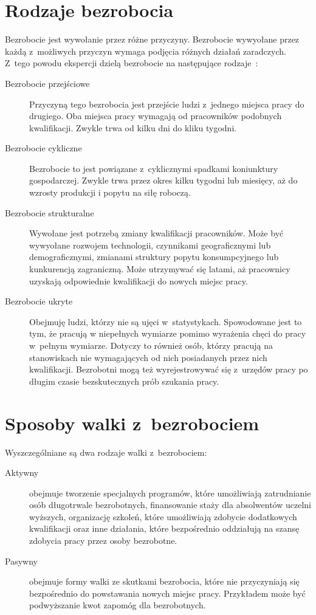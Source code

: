 \documentclass[12pt]{article}
\begin{document}
    \section*{Rodzaje bezrobocia}
    Bezrobocie jest wywołanie przez różne przyczyny. Bezrobocie wywyołane przez każdą z~możliwych przyczyn wymaga podjęcia różnych działań zaradczych. Z~tego powodu ekspercji dzielą bezrobocie na następujące rodzaje~\cite{eko}:
    \begin{description}
        \item[Bezrobocie przejściowe] Przyczyną tego bezrobocia jest przejście ludzi z~jednego miejsca pracy do drugiego. Oba miejsca pracy wymagają od pracowników podobnych kwalifikacji. Zwykle trwa od kilku dni do kliku tygodni.
        \item[Bezrobocie cykliczne] Bezrobocie to jest powiązane z~cyklicznymi spadkami koniunktury gospodarczej. Zwykle trwa przez okres kilku tygodni lub miesięcy, aż do wzrosty produkcji i popytu na siłę roboczą.
        \item[Bezrobocie strukturalne] Wywołane jest potrzebą zmiany kwalifikacji pracowników. Może być wywyołane rozwojem technologii, czynnikami geograficznymi lub demograficznymi, zmianami struktury popytu konsumpcyjnego lub kunkurencją zagraniczną. Może utrzymywać się latami, aż pracownicy uzyskają odpowiednie kwalifikacji do nowych miejsc pracy.
        \item[Bezrobocie ukryte] Obejmuję ludzi, którzy nie są ujęci w~statystykach. Spowodowane jest to tym, że pracują w niepełnych wymiarze pomimo wyrażenia chęci do pracy w~pełnym wymiarze. Dotyczy to również osób, którzy pracują na stanowiskach nie wymagających od nich posiadanych przez nich kwalifikacji. Bezrobotni mogą też wyrejestrowywać się z~urzędów pracy po długim czasie bezskutecznych prób szukania pracy.
    \end{description}

    \section*{Sposoby walki z~bezrobociem}
    
    Wyszczególniane są dwa rodzaje walki z~bezrobociem:
    
    \begin{description}
        \item[Aktywny] obejmuje tworzenie specjalnych programów, które umożliwiają zatrudnianie osób długotrwale bezrobotnych, finansowanie staży dla absolwentów uczelni wyższych, organizację szkoleń, które umożliwiają zdobycie dodatkowych kwalifikacji oraz inne działania, które bezpośrednio oddziałują na szansę zdobycia pracy przez osoby bezrobotne.
        \item[Pasywny] obejmuje formy walki ze skutkami bezrobocia, które nie przyczyniają się bezpośrednio do powstawania nowych miejsc pracy. Przykładem może być podwyższanie kwot zapomóg dla bezrobotnych.
    \end{description}
   
\end{document}
